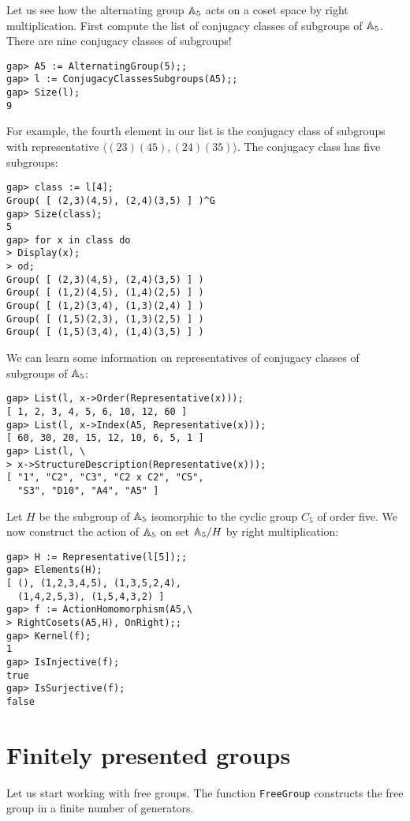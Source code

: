 \begin{example}
Let us see how the alternating group
$\mathbb{A}_5$ acts on a coset space by
right multiplication. First compute the list of conjugacy classes of subgroups of $\mathbb{A}_5$. There
are nine conjugacy classes of subgroups!

\begin{lstlisting}
gap> A5 := AlternatingGroup(5);;
gap> l := ConjugacyClassesSubgroups(A5);;
gap> Size(l);
9
\end{lstlisting}
For example, the fourth element in our list
is the conjugacy class of subgroups
with representative 
$\langle (23)(45),(24)(35)\rangle$. The conjugacy 
class has five subgroups:
\begin{lstlisting}
gap> class := l[4];
Group( [ (2,3)(4,5), (2,4)(3,5) ] )^G
gap> Size(class);
5
gap> for x in class do
> Display(x);
> od;
Group( [ (2,3)(4,5), (2,4)(3,5) ] )
Group( [ (1,2)(4,5), (1,4)(2,5) ] )
Group( [ (1,2)(3,4), (1,3)(2,4) ] )
Group( [ (1,5)(2,3), (1,3)(2,5) ] )
Group( [ (1,5)(3,4), (1,4)(3,5) ] )
\end{lstlisting}

We can learn some information on representatives
of conjugacy classes of subgroups of $\mathbb{A}_5$:
\begin{lstlisting}
gap> List(l, x->Order(Representative(x)));
[ 1, 2, 3, 4, 5, 6, 10, 12, 60 ]
gap> List(l, x->Index(A5, Representative(x)));
[ 60, 30, 20, 15, 12, 10, 6, 5, 1 ]
gap> List(l, \
> x->StructureDescription(Representative(x)));
[ "1", "C2", "C3", "C2 x C2", "C5",
  "S3", "D10", "A4", "A5" ]
\end{lstlisting}
        Let $H$ be the subgroup of $\mathbb{A}_5$
        isomorphic to the cyclic group $C_5$ of order five.
        We now construct the action of $\mathbb{A}_5$ on
        set $\mathbb{A}_5/H$ 
        by right multiplication:
\begin{lstlisting}
gap> H := Representative(l[5]);;
gap> Elements(H);
[ (), (1,2,3,4,5), (1,3,5,2,4),
  (1,4,2,5,3), (1,5,4,3,2) ]
gap> f := ActionHomomorphism(A5,\
> RightCosets(A5,H), OnRight);;
gap> Kernel(f);
1
gap> IsInjective(f);
true
gap> IsSurjective(f);
false
\end{lstlisting}
\end{example}


\section{Finitely presented groups}

Let us start working with free groups.  The function \lstinline{FreeGroup}
constructs the free group in a finite number of generators. 

